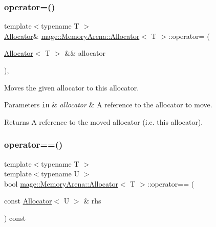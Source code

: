 \subsubsection{\texorpdfstring{operator=()}{operator=()}\hspace{0.1cm}{\footnotesize\ttfamily [2/2]}}
{\footnotesize\ttfamily template$<$typename T $>$ \\
\mbox{\hyperlink{classmage_1_1_memory_arena_1_1_allocator}{Allocator}}\& \mbox{\hyperlink{classmage_1_1_memory_arena_1_1_allocator}{mage\+::\+Memory\+Arena\+::\+Allocator}}$<$ T $>$\+::operator= (\begin{DoxyParamCaption}\item[{\mbox{\hyperlink{classmage_1_1_memory_arena_1_1_allocator}{Allocator}}$<$ T $>$ \&\&}]{allocator }\end{DoxyParamCaption})\hspace{0.3cm}{\ttfamily [default]}, {\ttfamily [noexcept]}}

Moves the given allocator to this allocator.


\begin{DoxyParams}[1]{Parameters}
\mbox{\tt in}  & {\em allocator} & A reference to the allocator to move. \\
\hline
\end{DoxyParams}
\begin{DoxyReturn}{Returns}
A reference to the moved allocator (i.\+e. this allocator). 
\end{DoxyReturn}
\mbox{\label{classmage_1_1_memory_arena_1_1_allocator_af5dbd3bc4fd2c724000c4c18d1859757}} 
\subsubsection{\texorpdfstring{operator==()}{operator==()}}
{\footnotesize\ttfamily template$<$typename T $>$ \\
template$<$typename U $>$ \\
bool \mbox{\hyperlink{classmage_1_1_memory_arena_1_1_allocator}{mage\+::\+Memory\+Arena\+::\+Allocator}}$<$ T $>$\+::operator== (\begin{DoxyParamCaption}\item[{const \mbox{\hyperlink{classmage_1_1_memory_arena_1_1_allocator}{Allocator}}$<$ U $>$ \&}]{rhs }\end{DoxyParamCaption}) const\hspace{0.3cm}{\ttfamily [noexcept]}}

